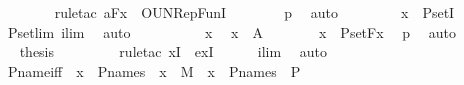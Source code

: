 \begin{isabellebody}
\ \ \ \ \ \ \isamarkupfalse%
\ {\isacharparenleft}{\kern0pt}rule{\isacharunderscore}{\kern0pt}tac\ a{\isacharequal}{\kern0pt}{\isachardoublequoteopen}F{\isacharparenleft}{\kern0pt}x{\isacharparenright}{\kern0pt}{\isachardoublequoteclose}\ \ OUN{\isacharunderscore}{\kern0pt}RepFunI{\isacharparenright}{\kern0pt}\isanewline
\ \ \ \ \ \ \isamarkupfalse%
\ p{}\ \isamarkupfalse%
\ auto\ \isanewline
\ \ \ \ \isamarkupfalse%
\ \isamarkupfalse%
\ {\isachardoublequoteopen}x\ {\isasymin}\ P{\isacharunderscore}{\kern0pt}set{\isacharparenleft}{\kern0pt}I{\isacharparenright}{\kern0pt}\ {\isachardoublequoteclose}\ \isamarkupfalse%
\ P{\isacharunderscore}{\kern0pt}set{\isacharunderscore}{\kern0pt}lim\ ilim\ \isamarkupfalse%
\ auto\isanewline
\ \ \isamarkupfalse%
\ \isanewline
\ \ \ \ \isamarkupfalse%
\ x\ \isamarkupfalse%
\ {\isachardoublequoteopen}x\ {\isasymin}\ A{\isachardoublequoteclose}\isanewline
\ \ \ \ \isamarkupfalse%
\ \isamarkupfalse%
\ {\isachardoublequoteopen}x\ {\isasymin}\ P{\isacharunderscore}{\kern0pt}set{\isacharparenleft}{\kern0pt}F{\isacharparenleft}{\kern0pt}x{\isacharparenright}{\kern0pt}{\isacharparenright}{\kern0pt}{\isachardoublequoteclose}\ \isamarkupfalse%
\ p{}\ \isamarkupfalse%
\ auto\ \isanewline
\ \ \isamarkupfalse%
\isanewline
\ \ \isamarkupfalse%
\ \isamarkupfalse%
\ {\isacharquery}{\kern0pt}thesis\ \ \ \isanewline
\ \ \ \ \isamarkupfalse%
\ {\isacharparenleft}{\kern0pt}rule{\isacharunderscore}{\kern0pt}tac\ x{\isacharequal}{\kern0pt}I\ \ exI{\isacharparenright}{\kern0pt}\isanewline
\ \ \ \ \isamarkupfalse%
\ ilim\ \isamarkupfalse%
\ auto\isanewline
{}\isamarkupfalse%
%
\endisatagproof
{\isafoldproof}%
%
\isadelimproof
\isanewline
%
\endisadelimproof
\isanewline
{}\isamarkupfalse%
\ P{\isacharunderscore}{\kern0pt}name{\isacharunderscore}{\kern0pt}iff\ {\isacharcolon}{\kern0pt}\ {\isachardoublequoteopen}x\ {\isasymin}\ P{\isacharunderscore}{\kern0pt}names\ {\isasymlongleftrightarrow}\ {\isacharparenleft}{\kern0pt}x\ {\isasymin}\ M\ {\isasymand}\ x\ {\isasymsubseteq}\ P{\isacharunderscore}{\kern0pt}names\ {\isasymtimes}\ P{\isacharparenright}{\kern0pt}{\isachardoublequoteclose}\ \isanewline
%
\isadelimproof
%
\endisadelimproof

\end{isabellebody}
